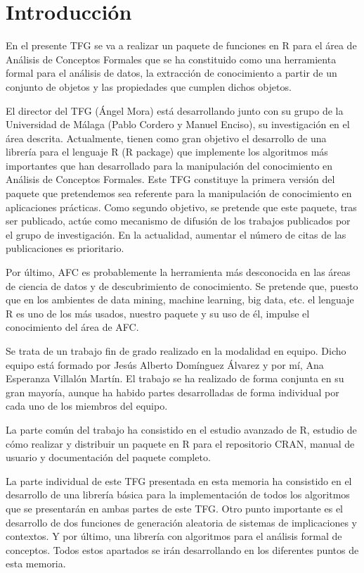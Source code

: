 \section{Introducci\'on}

En el presente TFG se va a realizar un paquete de funciones en 
R para el \'area de An\'alisis de Conceptos Formales que se ha 
constituido como una herramienta formal para el an\'alisis de datos, 
la extracci\'on de conocimiento a partir de un 
conjunto de objetos y las propiedades que cumplen dichos objetos.

El director del TFG (\'Angel Mora) est\'a desarrollando junto 
con su grupo de la Universidad de M\'alaga (Pablo Cordero y Manuel 
Enciso), su investigaci\'on en el \'area descrita. Actualmente, 
tienen como gran objetivo el desarrollo de una librer\'ia para el 
lenguaje R (R package) que implemente los algoritmos m\'as 
importantes que han desarrollado para la manipulaci\'on del 
conocimiento en An\'alisis de Conceptos Formales. Este TFG 
constituye la primera versi\'on del paquete que pretendemos sea 
referente para la manipulaci\'on de conocimiento en aplicaciones 
pr\'acticas. Como segundo objetivo, se pretende que este paquete, tras
ser publicado, act\'ue como mecanismo de difusi\'on de los trabajos 
publicados por el grupo de investigaci\'on. En la actualidad, aumentar el 
n\'umero de citas de las publicaciones es prioritario.

Por \'ultimo, AFC es probablemente la herramienta m\'as desconocida en las \'areas 
de ciencia de datos y de descubrimiento de conocimiento. Se pretende que, puesto que en los 
ambientes de data mining, machine learning, big data, etc. el lenguaje R es uno de los m\'as 
usados, nuestro paquete y su uso de \'el, impulse el conocimiento del \'area de AFC.

Se trata de un trabajo fin de grado realizado en la modalidad en equipo. 
Dicho equipo est\'a formado por Jes\'us Alberto Dom\'inguez \'Alvarez y por m\'i, 
Ana Esperanza Villal\'on Mart\'in. El trabajo se ha realizado de forma conjunta en su 
gran mayor\'ia, aunque ha habido partes desarrolladas de forma individual por cada uno 
de los miembros del equipo.

La parte com\'un del trabajo ha consistido en el estudio avanzado de R, estudio de c\'omo 
realizar y distribuir un paquete en R para el repositorio CRAN, manual de usuario y documentaci\'on del 
paquete completo.

La parte individual de este TFG presentada en esta memoria ha consistido en el desarrollo de una librer\'ia b\'asica 
para la implementaci\'on de todos los algoritmos que se presentar\'an en ambas partes de este TFG. Otro punto importante es 
el desarrollo de dos funciones de generaci\'on aleatoria de sistemas de implicaciones y contextos. Y por \'ultimo, una librer\'ia 
con algoritmos para el an\'alisis formal de conceptos. Todos estos apartados se ir\'an desarrollando en los diferentes puntos de esta memoria.
\\
\\


